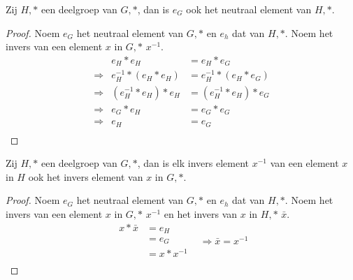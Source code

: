 \documentclass[main.tex]{subfiles}
\begin{document}
\begin{st}
  \label{st:deelgroep-zelfde-neutraal-element}
  Zij $H,*$ een deelgroep van $G,*$, dan is $e_{G}$ ook het neutraal element van $H,*$.

  \begin{proof}
    Noem $e_{G}$ het neutraal element van $G,*$ en $e_{h}$ dat van $H,*$. Noem het invers van een element $x$ in $G,*$ $x^{-1}$.
    \[
    \begin{array}{rrl}
                  & e_{H} * e_{H} &= e_{H} * e_{G}\\
      \Rightarrow & e^{-1}_{H} * (e_{H} * e_{H}) &= e^{-1}_{H} * (e_{H} * e_{G})\\
      \Rightarrow & (e^{-1}_{H} * e_{H}) * e_{H} &= (e^{-1}_{H} * e_{H}) * e_{G}\\
      \Rightarrow & e_{G} * e_{H} &= e_{G} * e_{G}\\
      \Rightarrow & e_{H} &= e_{G}\\
    \end{array}
    \]
  \end{proof}
\end{st}

\begin{st}
  \label{st:deelgroep-houdt-invers-ook-in}
  Zij $H,*$ een deelgroep van $G,*$, dan is elk invers element $x^{-1}$ van een element $x$ in $H$ ook het invers element van $x$ in $G,*$.

  \begin{proof}
    Noem $e_{G}$ het neutraal element van $G,*$ en $e_{h}$ dat van $H,*$.
    Noem het invers van een element $x$ in $G,*$ $x^{-1}$ en het invers van $x$ in $H,*$ $\bar{x}$.
    \[
    \begin{array}{rll}
      x * \bar x &= e_{H} &\\
                 &= e_{G} &\\
                 &= x * x^{-1} &\\
    \end{array}
    \Rightarrow \bar x = x^{-1}
    \]
  \end{proof}
\end{st}
\end{document}
